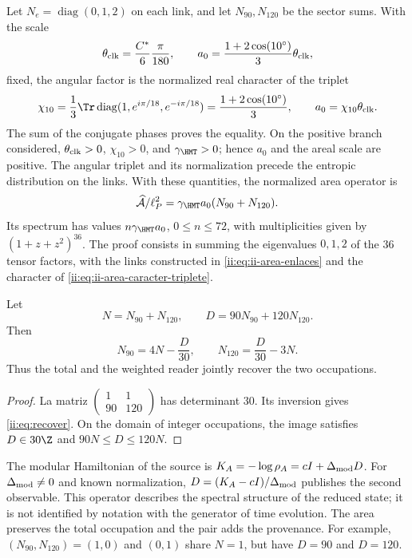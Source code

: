 Let $N_e=\operatorname{diag}(0,1,2)$ on each link, and let
$N_{90},N_{120}$ be the sector sums. With the scale
\[
\theta_{\rm clk}=\frac{C^*}{6}\frac{\pi}{180},\qquad
a_0=\frac{1+2\cos(10^\circ)}3\theta_{\rm clk},
\]
fixed, the angular factor is the normalized real character of the triplet
\begin{equation}
 \chi_{10}=\frac13\Tr\operatorname{diag}
       (1,e^{i\pi/18},e^{-i\pi/18})
 =\frac{1+2\cos(10^\circ)}3,
 \qquad a_0=\chi_{10}\theta_{\rm clk}.
 \label{ii:eq:ii-area-caracter-triplete}
\end{equation}
The sum of the conjugate phases proves the equality. On the positive branch
considered, \(\theta_{\rm clk}>0\), \(\chi_{10}>0\), and
\(\gamma_{\HMT}>0\); hence \(a_0\) and the areal scale are
positive. The angular triplet and its normalization precede the
entropic distribution on the links. With these quantities,
the normalized area operator is
\[
\widehat{\mathcal A}/\ell_P^2
=\gamma_{\HMT}a_0(N_{90}+N_{120}).
\]
Its spectrum has values $n\gamma_{\HMT}a_0$, $0\le n\le72$,
with multiplicities given by $(1+z+z^2)^{36}$.
The proof consists in summing the eigenvalues $0,1,2$ of the
36 tensor factors, with the links constructed in \eqref{ii:eq:ii-area-enlaces} and the character of \eqref{ii:eq:ii-area-caracter-triplete}.

\begin{theorem}
Let
\[
N=N_{90}+N_{120},\qquad D=90N_{90}+120N_{120}.
\]
Then
\begin{equation}
N_{90}=4N-\frac D{30},\qquad
N_{120}=\frac D{30}-3N.
\label{ii:eq:recover}
\end{equation}
Thus the total and the weighted reader jointly recover
the two occupations.
\end{theorem}
\begin{proof}
La matriz $\left(\begin{smallmatrix}1&1\\90&120\end{smallmatrix}\right)$
has determinant $30$. Its inversion gives \eqref{ii:eq:recover}.
On the domain of integer occupations, the image satisfies
$D\in30\Z$ and $90N\le D\le120N$.
\end{proof}

The modular Hamiltonian of the source is
$K_A=-\log\rho_A=cI+\Delta_{\rm mod}D$.
For $\Delta_{\rm mod}\ne0$ and known normalization,
$D=(K_A-cI)/\Delta_{\rm mod}$ publishes the second observable.
This operator describes the spectral structure of the reduced state;
it is not identified by notation with the generator of time evolution.
The area preserves the total occupation and the pair adds the provenance.
For example, $(N_{90},N_{120})=(1,0)$ and $(0,1)$ share $N=1$,
but have $D=90$ and $D=120$.



